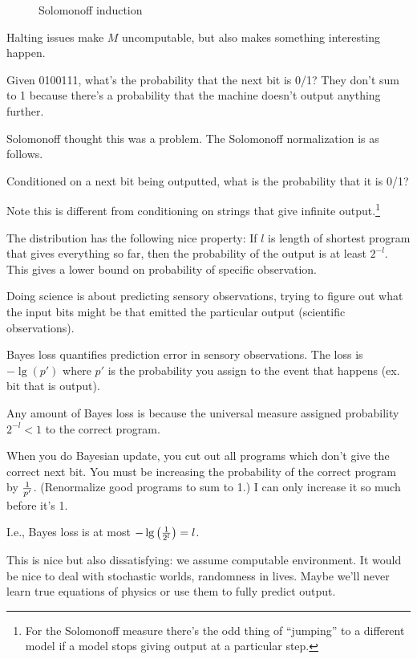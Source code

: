 \documentclass[11pt]{article}
\begin{document}
\begin{figure}[h!]
\caption{Solomonoff induction}
\end{figure}

Halting issues make $M$ uncomputable, but also makes something interesting happen.

Given 0100111, what's the probability that the next bit is 0/1? They don't sum to 1 because there's a probability that the machine doesn't output anything further.

Solomonoff thought this was a problem. The Solomonoff normalization is as follows.
\begin{df}
Conditioned on a next bit being outputted, what is the probability that it is 0/1?
\end{df}
Note this is different from conditioning on strings that give infinite output.\footnote{For the Solomonoff measure there's the odd thing of ``jumping'' to a different model if a model stops giving output at a particular step.}

The distribution has the following nice property: If $l$ is length of shortest program that gives everything so far, then the probability of the output is at least $2^{-l}$. This gives a lower bound on probability of specific observation.


Doing science is about predicting sensory observations, trying to figure out what the input bits might be that emitted the particular output (scientific observations).

Bayes loss quantifies prediction error in sensory  observations. %
The loss is $-\lg (p')$ where $p'$ is the probability you assign to the event that happens (ex. bit that is output).

Any amount of Bayes loss is because the universal measure assigned probability $2^{-l}<1$ to the correct program.

When you do Bayesian update, you cut out all programs which don't give the correct next bit. You must be increasing the probability of the correct program by $\frac{1}{p'}$. (Renormalize good programs to sum to 1.) I can only increase it so much before it's 1.

I.e., Bayes loss is at most $-\lg\left( {\frac{1}{2^l}} \right)=l$.

This is nice but also dissatisfying: we assume computable environment. It would be nice to deal with stochastic worlds, randomness in lives. 
Maybe we'll never learn true equations of physics or use them to fully predict output.
\end{document}
